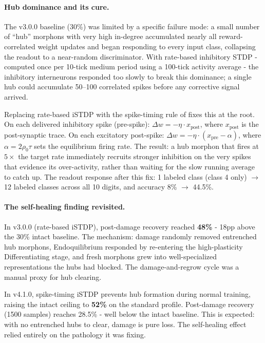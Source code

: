 \paragraph{Hub dominance and its cure.}
The v3.0.0 baseline (30\%) was limited by a specific failure mode: a small number of ``hub'' morphons with very high in-degree accumulated nearly all reward-correlated weight updates and began responding to every input class, collapsing the readout to a near-random discriminator. With rate-based inhibitory STDP - computed once per 10-tick medium period using a 100-tick activity average - the inhibitory interneurons responded too slowly to break this dominance; a single hub could accumulate 50--100 correlated spikes before any corrective signal arrived.

Replacing rate-based iSTDP with the spike-timing rule of \citet{vogels2011inhibitory} fixes this at the root. On each delivered inhibitory spike (pre-spike): $\Delta w = -\eta \cdot x_{\text{post}}$, where $x_{\text{post}}$ is the post-synaptic trace. On each excitatory post-spike: $\Delta w = -\eta \cdot (x_{\text{pre}} - \alpha)$, where $\alpha = 2\rho_0\tau$ sets the equilibrium firing rate. The result: a hub morphon that fires at $5\times$ the target rate immediately recruits stronger inhibition on the very spikes that evidence its over-activity, rather than waiting for the slow running average to catch up. The readout response after this fix: 1 labeled class (class 4 only) $\rightarrow$ 12 labeled classes across all 10 digits, and accuracy 8\% $\rightarrow$ 44.5\%.

\paragraph{The self-healing finding revisited.}
\label{sec:self_healing_discussion}

In v3.0.0 (rate-based iSTDP), post-damage recovery reached \textbf{48\%} - 18pp above the 30\% intact baseline. The mechanism: damage randomly removed entrenched hub morphons, Endoquilibrium responded by re-entering the high-plasticity Differentiating stage, and fresh morphons grew into well-specialized representations the hubs had blocked. The damage-and-regrow cycle was a manual proxy for hub clearing.

In v4.1.0, spike-timing iSTDP prevents hub formation during normal training, raising the intact ceiling to \textbf{52\%} on the standard profile. Post-damage recovery (1500 samples) reaches 28.5\% - well below the intact baseline. This is expected: with no entrenched hubs to clear, damage is pure loss. The self-healing effect relied entirely on the pathology it was fixing.

